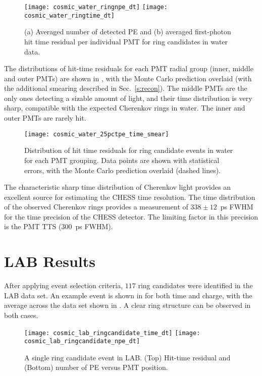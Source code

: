\begin{figure}
	\centering
	\texttt{[image: cosmic\_water\_ringnpe\_dt]}
	\texttt{[image: cosmic\_water\_ringtime\_dt]}
	\caption{(a) Averaged number of detected PE and (b) averaged first-photon hit time residual per individual PMT for ring candidates in water data.}
	\label{fig:cosmics_water_npes}
\end{figure}


The  distributions of hit-time residuals for each PMT radial group (inner, middle and outer PMTs) are shown in , with the Monte Carlo prediction overlaid (with the additional smearing described in Sec.~\ref{s:recon}). 
The middle PMTs are the only ones detecting a sizable amount of light, and their time distribution is very sharp, compatible with the expected Cherenkov rings in water. The inner and outer PMTs are rarely hit. 


\begin{figure}
	\centering
	\texttt{[image: cosmic\_water\_25pctpe\_time\_smear]}
	\caption{Distribution of hit time residuals for ring candidate events in water for each PMT grouping. Data points are shown with statistical errors, with the Monte Carlo prediction overlaid (dashed lines). }
	\label{fig:cosmics_water}
\end{figure}


The characteristic sharp time distribution of  Cherenkov light provides an excellent source for estimating the CHESS time resolution. The time distribution of the observed Cherenkov rings provides a measurement of $338\pm 12$~ps FWHM for the time precision of the CHESS detector. The limiting factor in this precision is the PMT TTS (300~ps FWHM). 

\section{LAB Results}

\label{sec:lab}

After applying event selection criteria, $117$ ring candidates were identified in the LAB data set. An example event is shown in  for both time and charge, with the average across the data set shown in . A clear ring structure can be observed in both cases. 

\begin{figure}[!t]
	\centering
	\texttt{[image: cosmic\_lab\_ringcandidate\_time\_dt]}
	\texttt{[image: cosmic\_lab\_ringcandidate\_npe\_dt]}
	\caption{A single ring candidate event in LAB. (Top) Hit-time residual and (Bottom) number of PE versus PMT position.}
	\label{fig:lab_ring}
\end{figure}

